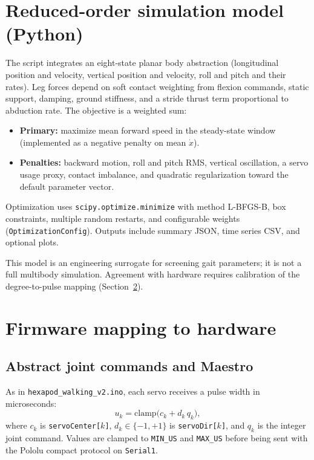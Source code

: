 \documentclass[11pt]{article}
\begin{document}
\section{Reduced-order simulation model (Python)}

The script integrates an eight-state planar body abstraction (longitudinal position and velocity, vertical position and velocity, roll and pitch and their rates). Leg forces depend on soft contact weighting from flexion commands, static support, damping, ground stiffness, and a stride thrust term proportional to abduction rate. The objective is a weighted sum:
\begin{itemize}
    \item \textbf{Primary:} maximize mean forward speed in the steady-state window (implemented as a negative penalty on mean $\dot{x}$).
    \item \textbf{Penalties:} backward motion, roll and pitch RMS, vertical oscillation, a servo usage proxy, contact imbalance, and quadratic regularization toward the default parameter vector.
\end{itemize}

Optimization uses \texttt{scipy.optimize.minimize} with method L-BFGS-B, box constraints, multiple random restarts, and configurable weights (\texttt{OptimizationConfig}). Outputs include summary JSON, time series CSV, and optional plots.

This model is an engineering surrogate for screening gait parameters; it is not a full multibody simulation. Agreement with hardware requires calibration of the degree-to-pulse mapping (Section~\ref{sec:hardware}).

\section{Firmware mapping to hardware}
\label{sec:hardware}

\subsection{Abstract joint commands and Maestro}

As in \texttt{hexapod\_walking\_v2.ino}, each servo receives a pulse width in microseconds:
\[
u_k = \mathrm{clamp}\bigl( c_k + d_k \, q_k \bigr),
\]
where $c_k$ is \texttt{servoCenter[$k$]}, $d_k \in \{-1,+1\}$ is \texttt{servoDir[$k$]}, and $q_k$ is the integer joint command. Values are clamped to \texttt{MIN\_US} and \texttt{MAX\_US} before being sent with the Pololu compact protocol on \texttt{Serial1}.
\end{document}
